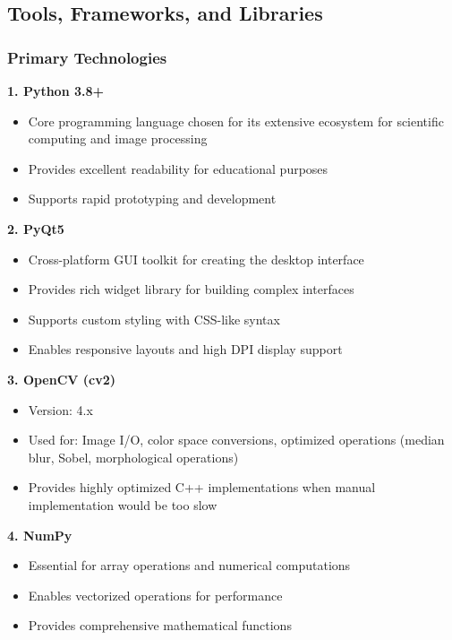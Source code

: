 \documentclass[12pt,a4paper]{article}
\begin{document}
\subsection{Tools, Frameworks, and Libraries}

\subsubsection{Primary Technologies}

\textbf{1. Python 3.8+}
\begin{itemize}
    \item Core programming language chosen for its extensive ecosystem for scientific computing and image processing
    \item Provides excellent readability for educational purposes
    \item Supports rapid prototyping and development
\end{itemize}

\textbf{2. PyQt5}
\begin{itemize}
    \item Cross-platform GUI toolkit for creating the desktop interface
    \item Provides rich widget library for building complex interfaces
    \item Supports custom styling with CSS-like syntax
    \item Enables responsive layouts and high DPI display support
\end{itemize}

\textbf{3. OpenCV (cv2)}
\begin{itemize}
    \item Version: 4.x
    \item Used for: Image I/O, color space conversions, optimized operations (median blur, Sobel, morphological operations)
    \item Provides highly optimized C++ implementations when manual implementation would be too slow
\end{itemize}

\textbf{4. NumPy}
\begin{itemize}
    \item Essential for array operations and numerical computations
    \item Enables vectorized operations for performance
    \item Provides comprehensive mathematical functions
\end{itemize}
\end{document}
